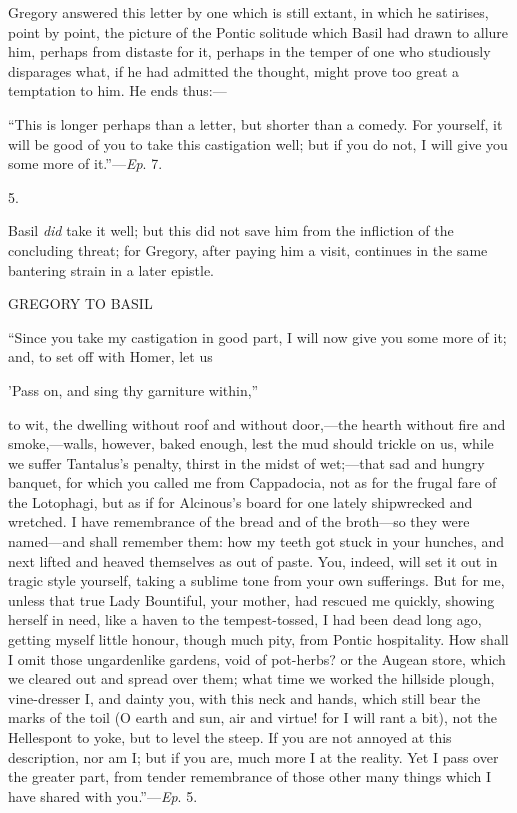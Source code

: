 Gregory answered this letter by one which is still extant, in which
he satirises, point by point, the picture of the Pontic solitude which
Basil had drawn to allure him, perhaps from distaste for it, perhaps
in the temper of one who studiously disparages what, if he had
admitted the thought, might prove too great a temptation to him. He
ends thus:—

``This is longer perhaps than a letter, but shorter than a
comedy. For yourself, it will be good of you to take this castigation
well; but if you do not, I will give you some more of it.''—\emph{Ep}.
7.

5.

Basil \emph{did} take it well; but this did not save him from the
infliction of the concluding threat; for Gregory, after paying him a
visit, continues in the same bantering strain in a later epistle.

GREGORY TO BASIL

``Since you take my castigation in good part, I will now give
you some more of it; and, to set off with Homer, let us

'Pass on, and sing thy garniture within,''

to wit, the dwelling without roof and without door,—the hearth
without fire and smoke,—walls, however, baked
enough, lest the mud should trickle on us, while we suffer Tantalus's
penalty, thirst in the midst of wet;—that sad and hungry banquet,
for which you called me from Cappadocia, not as for the frugal fare of
the Lotophagi, but as if for Alcinous's board for one lately
shipwrecked and wretched. I have remembrance of the bread and of the
broth—so they were named—and shall remember them: how my teeth got
stuck in your hunches, and next lifted and heaved themselves as out of
paste. You, indeed, will set it out in tragic style yourself, taking a
sublime tone from your own sufferings. But for me, unless that true
Lady Bountiful, your mother, had rescued me quickly, showing herself
in need, like a haven to the tempest-tossed, I had been dead long ago,
getting myself little honour, though much pity, from Pontic
hospitality. How shall I omit those ungardenlike gardens, void of
pot-herbs? or the Augean store, which we cleared out and spread over
them; what time we worked the hillside plough, vine-dresser I, and
dainty you, with this neck and hands, which still bear the marks of
the toil (O earth and sun, air and virtue! for I will rant a bit), not
the Hellespont to yoke, but to level the steep. If you are not annoyed
at this description, nor am I; but if you are, much more I at the
reality. Yet I pass over the greater part, from tender remembrance of
those other many things which I have shared with you.''—\emph{Ep}.
5.

